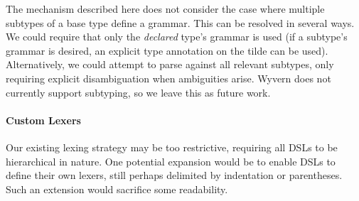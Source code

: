 The mechanism described here does not consider the case where multiple subtypes of a base type define a grammar. This can be resolved in several ways. We could require that only the \emph{declared} type's grammar is used (if a subtype's grammar is desired, an explicit type annotation on the tilde can be used). Alternatively, we could attempt to parse against all relevant subtypes, only requiring explicit disambiguation when ambiguities arise. Wyvern does not currently support subtyping, so we leave this as future work.


%
%

\paragraph{Custom Lexers} 

Our existing lexing strategy may be too restrictive, requiring all DSLs to be hierarchical in nature. One potential expansion would be to enable DSLs to define their own lexers, still perhaps delimited by indentation or parentheses. Such an extension would sacrifice some readability.

